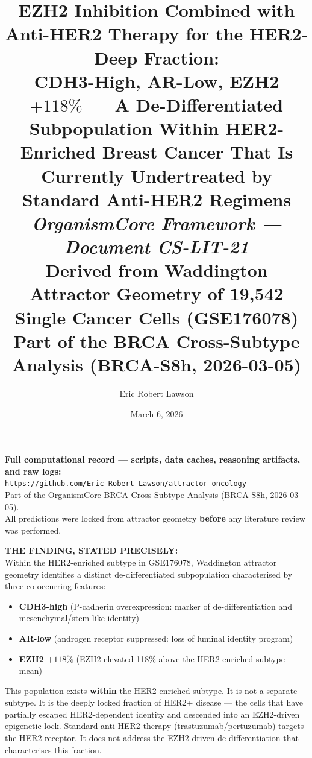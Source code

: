 \documentclass[12pt, a4paper]{article}
\title{
    \vspace{-1em}
    \textbf{EZH2 Inhibition Combined with Anti-HER2
    Therapy for the HER2-Deep Fraction:}\\[0.5em]
    \large CDH3-High, AR-Low, EZH2 $+118\%$ ---
    A De-Differentiated Subpopulation Within
    HER2-Enriched Breast Cancer That Is Currently
    Undertreated by Standard Anti-HER2 Regimens\\[0.4em]
    \normalsize \textit{OrganismCore Framework ---
    Document CS-LIT-21}\\[0.3em]
    \small Derived from Waddington Attractor Geometry
    of 19,542 Single Cancer Cells (GSE176078)\\[0.3em]
    \small Part of the BRCA Cross-Subtype Analysis
    (BRCA-S8h, 2026-03-05)
}
\author[1]{Eric Robert Lawson}
\affil[1]{
    OrganismCore\\
    \href{mailto:OrganismCore@proton.me}
         {OrganismCore@proton.me}\\
    ORCID:
    \href{https://orcid.org/0009-0002-0414-6544}
         {0009-0002-0414-6544}
}
\date{March 6, 2026}
\begin{document}

\maketitle
\thispagestyle{fancy}

\begin{center}
\colorbox{repobox}{
\begin{minipage}{0.88\textwidth}
\vspace{0.5em}
\centering
\textbf{Full computational record --- scripts, data
caches, reasoning artifacts, and raw logs:}\\[0.4em]
\href{https://github.com/Eric-Robert-Lawson/attractor-oncology}
{\texttt{https://github.com/Eric-Robert-Lawson/attractor-oncology}}
\\[0.3em]
\small Part of the OrganismCore BRCA Cross-Subtype
Analysis (BRCA-S8h, 2026-03-05).\\
All predictions were locked from attractor geometry
\textbf{before} any literature review was performed.
\vspace{0.5em}
\end{minipage}}
\end{center}

\vspace{1em}

\begin{center}
\colorbox{findingbox}{
\begin{minipage}{0.88\textwidth}
\vspace{0.5em}
\textbf{THE FINDING, STATED PRECISELY:}\\[0.4em]
Within the HER2-enriched subtype in GSE176078,
Waddington attractor geometry identifies a
distinct de-differentiated subpopulation
characterised by three co-occurring features:

\begin{itemize}[noitemsep]
    \item \textbf{CDH3-high} (P-cadherin
    overexpression: marker of de-differentiation
    and mesenchymal/stem-like identity)
    \item \textbf{AR-low} (androgen receptor
    suppressed: loss of luminal identity program)
    \item \textbf{EZH2 $+118\%$} (EZH2 elevated
    118\% above the HER2-enriched subtype mean)
\end{itemize}

This population exists \textbf{within} the
HER2-enriched subtype. It is not a separate
subtype. It is the deeply locked fraction of
HER2+ disease --- the cells that have partially
escaped HER2-dependent identity and descended
into an EZH2-driven epigenetic lock. Standard
anti-HER2 therapy (trastuzumab/pertuzumab)
targets the HER2 receptor. It does not address
the EZH2-driven de-differentiation that
characterises this fraction.
\vspace{0.5em}
\end{minipage}}
\end{center}
\end{document}
